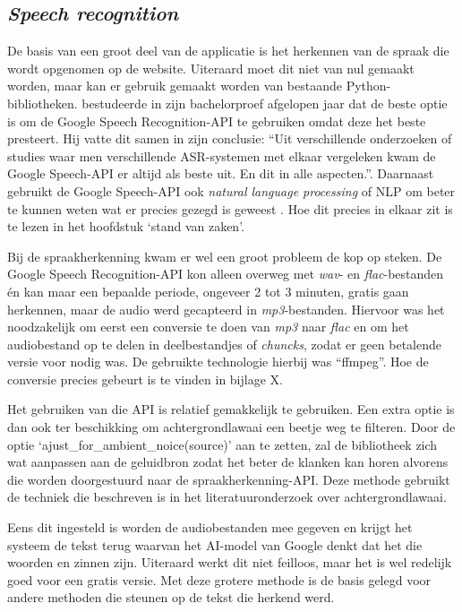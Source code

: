 \subsection{\textit{Speech recognition}}
De basis van een groot deel van de applicatie is het herkennen van de spraak die wordt opgenomen op de website. Uiteraard moet dit niet van nul gemaakt worden, maar kan er gebruik gemaakt worden van bestaande Python-bibliotheken. \textcite{Standaert2021} bestudeerde in zijn bachelorproef afgelopen jaar dat de beste optie is om de Google Speech Recognition-API te gebruiken omdat deze het beste presteert. Hij vatte dit samen in zijn conclusie: ``Uit verschillende onderzoeken of studies waar men verschillende ASR-systemen met elkaar vergeleken kwam de Google Speech-API er altijd als beste uit. En dit in alle aspecten.''. Daarnaast gebruikt de Google Speech-API ook \textit{natural language processing} of NLP om beter te kunnen weten wat er precies gezegd is geweest \autocite{GoogleCloud2022}. Hoe dit precies in elkaar zit is te lezen in het hoofdstuk `stand van zaken'.

Bij de spraakherkenning kwam er wel een groot probleem de kop op steken. De Google Speech Recognition-API kon alleen overweg met \textit{wav}- en \textit{flac}-bestanden én kan maar een bepaalde periode, ongeveer 2 tot 3 minuten, gratis gaan herkennen, maar de audio werd gecapteerd in \textit{mp3}-bestanden. Hiervoor was het noodzakelijk om eerst een conversie te doen van \textit{mp3} naar \textit{flac} en om het audiobestand op te delen in deelbestandjes of \textit{chuncks}, zodat er geen betalende versie voor nodig was. De gebruikte technologie hierbij was ``ffmpeg''. Hoe de conversie precies gebeurt is te vinden in bijlage X.

Het gebruiken van die API is relatief gemakkelijk te gebruiken. Een extra optie is dan ook ter beschikking om achtergrondlawaai een beetje weg te filteren. Door de optie `ajust\_for\_ambient\_noice(source)' aan te zetten, zal de bibliotheek zich wat aanpassen aan de geluidbron zodat het beter de klanken kan horen alvorens die worden doorgestuurd naar de spraakherkenning-API. Deze methode gebruikt de techniek die beschreven is in het literatuuronderzoek over achtergrondlawaai.

Eens dit ingesteld is worden de audiobestanden mee gegeven en krijgt het systeem de tekst terug waarvan het AI-model van Google denkt dat het die woorden en zinnen zijn. Uiteraard werkt dit niet feilloos, maar het is wel redelijk goed voor een gratis versie. Met deze grotere methode is de basis gelegd voor andere methoden die steunen op de tekst die herkend werd.

